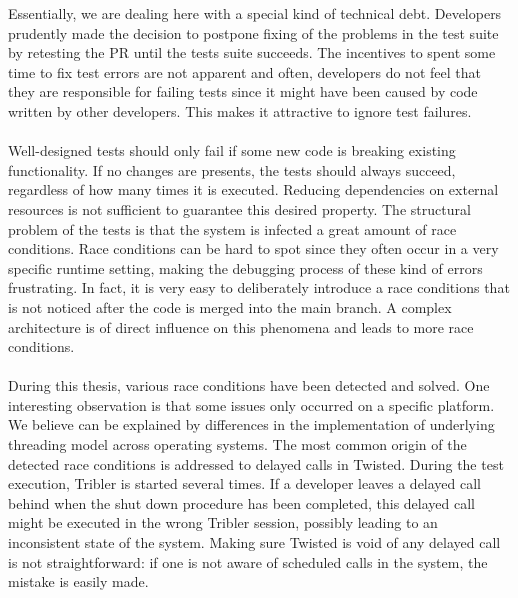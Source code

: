 Essentially, we are dealing here with a special kind of technical debt. Developers prudently made the decision to postpone fixing of the problems in the test suite by retesting the PR until the tests suite succeeds. The incentives to spent some time to fix test errors are not apparent and often, developers do not feel that they are responsible for failing tests since it might have been caused by code written by other developers. This makes it attractive to ignore test failures.\\\\
Well-designed tests should only fail if some new code is breaking existing functionality. If no changes are presents, the tests should always succeed, regardless of how many times it is executed. Reducing dependencies on external resources is not sufficient to guarantee this desired property. The structural problem of the tests is that the system is infected a great amount of race conditions. Race conditions can be hard to spot since they often occur in a very specific runtime setting, making the debugging process of these kind of errors frustrating. In fact, it is very easy to deliberately introduce a race conditions that is not noticed after the code is merged into the main branch. A complex architecture is of direct influence on this phenomena and leads to more race conditions.\\\\
During this thesis, various race conditions have been detected and solved. One interesting observation is that some issues only occurred on a specific platform. We believe can be explained by differences in the implementation of underlying threading model across operating systems. The most common origin of the detected race conditions is addressed to delayed calls in Twisted. During the test execution, Tribler is started several times. If a developer leaves a delayed call behind when the shut down procedure has been completed, this delayed call might be executed in the wrong Tribler session, possibly leading to an inconsistent state of the system. Making sure Twisted is void of any delayed call is not straightforward: if one is not aware of scheduled calls in the system, the mistake is easily made.

